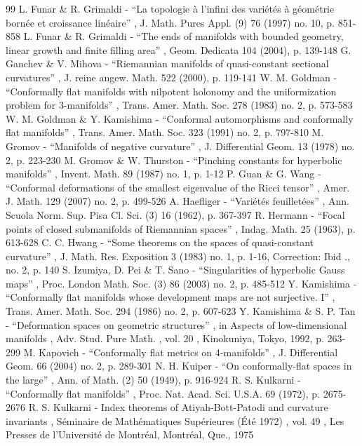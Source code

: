 \documentclass[10pt]{amsart}
\theoremstyle{definition}
\theoremstyle{remark}
\numberwithin{equation}{section}
\begin{document}
\begin{thebibliography}{99}
 L. Funar \& R. Grimaldi - “La topologie à l’infini des variétés à géométrie bornée et croissance linéaire” , J. Math. Pures Appl. (9) 76 (1997) no. 10, p. 851-858
 L. Funar \& R. Grimaldi - “The ends of manifolds with bounded geometry, linear growth and finite filling area” , Geom. Dedicata 104 (2004), p. 139-148
 G. Ganchev \& V. Mihova - “Riemannian manifolds of quasi-constant sectional curvatures” , J. reine angew. Math. 522 (2000), p. 119-141
 W. M. Goldman - “Conformally flat manifolds with nilpotent holonomy and the uniformization problem for $3$-manifolds” , Trans. Amer. Math. Soc. 278 (1983) no. 2, p. 573-583
 W. M. Goldman \& Y. Kamishima - “Conformal automorphisms and conformally flat manifolds” , Trans. Amer. Math. Soc. 323 (1991) no. 2, p. 797-810
 M. Gromov - “Manifolds of negative curvature” , J. Differential Geom. 13 (1978) no. 2, p. 223-230
 M. Gromov \& W. Thurston - “Pinching constants for hyperbolic manifolds” , Invent. Math. 89 (1987) no. 1, p. 1-12
 P. Guan \& G. Wang - “Conformal deformations of the smallest eigenvalue of the Ricci tensor” , Amer. J. Math. 129 (2007) no. 2, p. 499-526
 A. Haefliger - “Variétés feuilletées” , Ann. Scuola Norm. Sup. Pisa Cl. Sci. (3) 16 (1962), p. 367-397
 R. Hermann - “Focal points of closed submanifolds of Riemannian spaces” , Indag. Math. 25 (1963), p. 613-628
 C. C. Hwang - “Some theorems on the spaces of quasi-constant curvature” , J. Math. Res. Exposition 3 (1983) no. 1, p. 1-16, Correction: Ibid ., no. 2, p. 140
 S. Izumiya, D. Pei \& T. Sano - “Singularities of hyperbolic Gauss maps” , Proc. London Math. Soc. (3) 86 (2003) no. 2, p. 485-512
 Y. Kamishima - “Conformally flat manifolds whose development maps are not surjective. I” , Trans. Amer. Math. Soc. 294 (1986) no. 2, p. 607-623
 Y. Kamishima \& S. P. Tan - “Deformation spaces on geometric structures” , in Aspects of low-dimensional manifolds , Adv. Stud. Pure Math. , vol. 20 , Kinokuniya, Tokyo, 1992, p. 263-299
 M. Kapovich - “Conformally flat metrics on 4-manifolds” , J. Differential Geom. 66 (2004) no. 2, p. 289-301
 N. H. Kuiper - “On conformally-flat spaces in the large” , Ann. of Math. (2) 50 (1949), p. 916-924
 R. S. Kulkarni - “Conformally flat manifolds” , Proc. Nat. Acad. Sci. U.S.A. 69 (1972), p. 2675-2676
 R. S. Kulkarni - Index theorems of Atiyah-Bott-Patodi and curvature invariants , Séminaire de Mathématiques Supérieures (Été 1972) , vol. 49 , Les Presses de l’Université de Montréal, Montréal, Que., 1975

\end{thebibliography}
\end{document}
